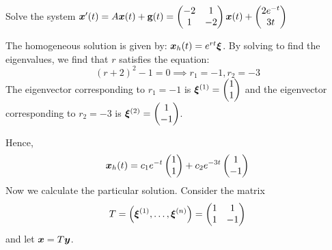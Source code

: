 \begin{eg}\label{eg:nonhom}
	Solve the system $\bm{x}'(t) = A \bm{x}(t) + \textbf{g}(t) = \begin{pmatrix}-2 & 1 \\ 1 & -2\end{pmatrix} \bm{x}(t) + \begin{pmatrix}2 e^{-t} \\ 3t\end{pmatrix}$
	
	The homogeneous solution is given by: $\bm{x}_h(t) = e^{rt} \bm{\xi}$. By solving to find the eigenvalues, we find that $r$ satisfies the equation:
	\[
	(r+2)^2 -1=0 \implies r_1 = -1, r_2 = -3
	\] 
	The eigenvector corresponding to $r_1 = -1$ is $\bm{\xi}^{(1)} = \begin{pmatrix}1 \\ 1\end{pmatrix}$ and the eigenvector corresponding to $r_2 = -3$ is $\bm{\xi}^{(2)} = \begin{pmatrix}1 \\ -1\end{pmatrix}$. 
	
	Hence,
	\[
	\bm{x}_h(t) = c_1 e^{-t} \begin{pmatrix}1 \\ 1\end{pmatrix} + c_2 e^{-3t} \begin{pmatrix}1 \\ -1\end{pmatrix}
	\]
	Now we calculate the particular solution. Consider the matrix
	\[
	T = \left(\bm{\xi}^{(1)}, \ldots, \bm{\xi}^{(n)}\right) = \begin{pmatrix}1 &1 \\ 1 &-1\end{pmatrix}
	\]
	and let $\bm{x} = T \bm{y}$.
	

\end{eg}
